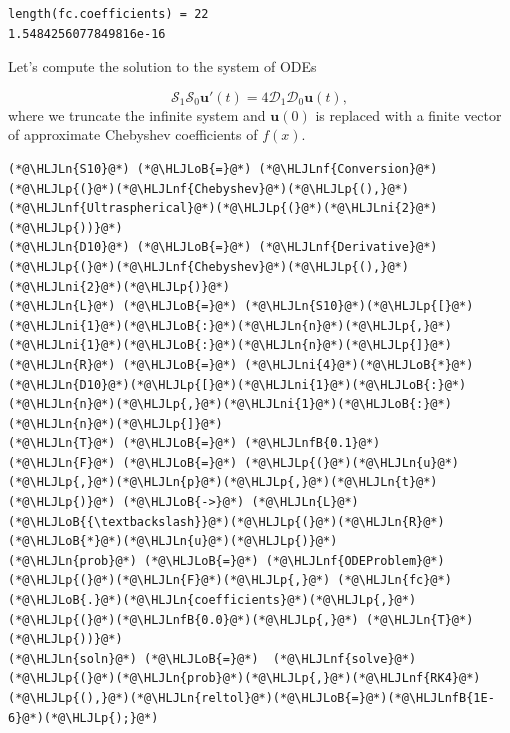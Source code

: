 \documentclass[12pt,a4paper]{article}
\newcommand{\HLJLn}[1]{#1}
\newcommand{\HLJLnf}[1]{\textcolor[RGB]{66,102,213}{#1}}
\newcommand{\HLJLnfB}[1]{\textcolor[RGB]{59,151,46}{#1}}
\newcommand{\HLJLni}[1]{\textcolor[RGB]{59,151,46}{#1}}
\newcommand{\HLJLoB}[1]{\textcolor[RGB]{102,102,102}{\textbf{#1}}}
\newcommand{\HLJLp}[1]{#1}
\begin{document}
\begin{lstlisting}
length(fc.coefficients) = 22
1.5484256077849816e-16
\end{lstlisting}


Let's compute the solution to the system of ODEs

\[
\mathcal{S}_1\mathcal{S}_0\mathbf{u}'(t) = 4\mathcal{D}_1\mathcal{D}_0 \mathbf{u}(t),
\]
where we truncate the infinite system and $\mathbf{u}(0)$ is replaced with a finite vector of approximate Chebyshev coefficients of $f(x)$. 


\begin{lstlisting}
(*@\HLJLn{S10}@*) (*@\HLJLoB{=}@*) (*@\HLJLnf{Conversion}@*)(*@\HLJLp{(}@*)(*@\HLJLnf{Chebyshev}@*)(*@\HLJLp{(),}@*)(*@\HLJLnf{Ultraspherical}@*)(*@\HLJLp{(}@*)(*@\HLJLni{2}@*)(*@\HLJLp{))}@*)
(*@\HLJLn{D10}@*) (*@\HLJLoB{=}@*) (*@\HLJLnf{Derivative}@*)(*@\HLJLp{(}@*)(*@\HLJLnf{Chebyshev}@*)(*@\HLJLp{(),}@*)(*@\HLJLni{2}@*)(*@\HLJLp{)}@*)
(*@\HLJLn{L}@*) (*@\HLJLoB{=}@*) (*@\HLJLn{S10}@*)(*@\HLJLp{[}@*)(*@\HLJLni{1}@*)(*@\HLJLoB{:}@*)(*@\HLJLn{n}@*)(*@\HLJLp{,}@*)(*@\HLJLni{1}@*)(*@\HLJLoB{:}@*)(*@\HLJLn{n}@*)(*@\HLJLp{]}@*)
(*@\HLJLn{R}@*) (*@\HLJLoB{=}@*) (*@\HLJLni{4}@*)(*@\HLJLoB{*}@*)(*@\HLJLn{D10}@*)(*@\HLJLp{[}@*)(*@\HLJLni{1}@*)(*@\HLJLoB{:}@*)(*@\HLJLn{n}@*)(*@\HLJLp{,}@*)(*@\HLJLni{1}@*)(*@\HLJLoB{:}@*)(*@\HLJLn{n}@*)(*@\HLJLp{]}@*)
(*@\HLJLn{T}@*) (*@\HLJLoB{=}@*) (*@\HLJLnfB{0.1}@*)
(*@\HLJLn{F}@*) (*@\HLJLoB{=}@*) (*@\HLJLp{(}@*)(*@\HLJLn{u}@*)(*@\HLJLp{,}@*)(*@\HLJLn{p}@*)(*@\HLJLp{,}@*)(*@\HLJLn{t}@*)(*@\HLJLp{)}@*) (*@\HLJLoB{->}@*) (*@\HLJLn{L}@*)(*@\HLJLoB{{\textbackslash}}@*)(*@\HLJLp{(}@*)(*@\HLJLn{R}@*)(*@\HLJLoB{*}@*)(*@\HLJLn{u}@*)(*@\HLJLp{)}@*)
(*@\HLJLn{prob}@*) (*@\HLJLoB{=}@*) (*@\HLJLnf{ODEProblem}@*)(*@\HLJLp{(}@*)(*@\HLJLn{F}@*)(*@\HLJLp{,}@*) (*@\HLJLn{fc}@*)(*@\HLJLoB{.}@*)(*@\HLJLn{coefficients}@*)(*@\HLJLp{,}@*) (*@\HLJLp{(}@*)(*@\HLJLnfB{0.0}@*)(*@\HLJLp{,}@*) (*@\HLJLn{T}@*)(*@\HLJLp{))}@*)
(*@\HLJLn{soln}@*) (*@\HLJLoB{=}@*)  (*@\HLJLnf{solve}@*)(*@\HLJLp{(}@*)(*@\HLJLn{prob}@*)(*@\HLJLp{,}@*)(*@\HLJLnf{RK4}@*)(*@\HLJLp{(),}@*)(*@\HLJLn{reltol}@*)(*@\HLJLoB{=}@*)(*@\HLJLnfB{1E-6}@*)(*@\HLJLp{);}@*)
\end{lstlisting}
\end{document}
